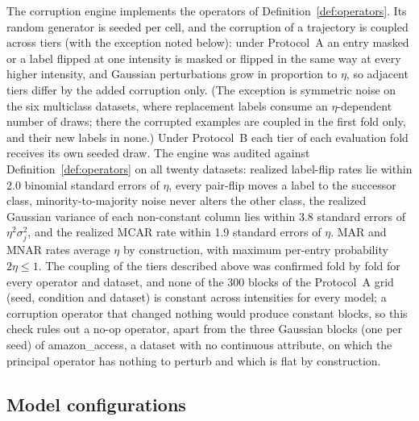 \documentclass[pdflatex,sn-mathphys]{sn-jnl}
\theoremstyle{thmstyleone}
\theoremstyle{thmstyletwo}
\theoremstyle{thmstylethree}
\begin{document}
The corruption engine implements the operators of Definition~\ref{def:operators}. Its random generator is seeded per cell, and the corruption of a trajectory is coupled across tiers (with the exception noted below): under Protocol~A an entry masked or a label flipped at one intensity is masked or flipped in the same way at every higher intensity, and Gaussian perturbations grow in proportion to $\eta$, so adjacent tiers differ by the added corruption only. (The exception is symmetric noise on the six multiclass datasets, where replacement labels consume an $\eta$-dependent number of draws; there the corrupted examples are coupled in the first fold only, and their new labels in none.) Under Protocol~B each tier of each evaluation fold receives its own seeded draw. The engine was audited against Definition~\ref{def:operators} on all twenty datasets: realized label-flip rates lie within 2.0 binomial standard errors of $\eta$, every pair-flip moves a label to the successor class, minority-to-majority noise never alters the other class, the realized Gaussian variance of each non-constant column lies within 3.8 standard errors of $\eta^{2}\sigma_j^{2}$, and the realized MCAR rate within 1.9 standard errors of $\eta$. MAR and MNAR rates average $\eta$ by construction, with maximum per-entry probability $2\eta\le1$. The coupling of the tiers described above was confirmed fold by fold for every operator and dataset, and none of the 300 blocks of the Protocol~A grid (seed, condition and dataset) is constant across intensities for every model; a corruption operator that changed nothing would produce constant blocks, so this check rules out a no-op operator, apart from the three Gaussian blocks (one per seed) of amazon\_access, a dataset with no continuous attribute, on which the principal operator has nothing to perturb and which is flat by construction.

\subsection{Model configurations}\label{sec:method:models}
\end{document}
